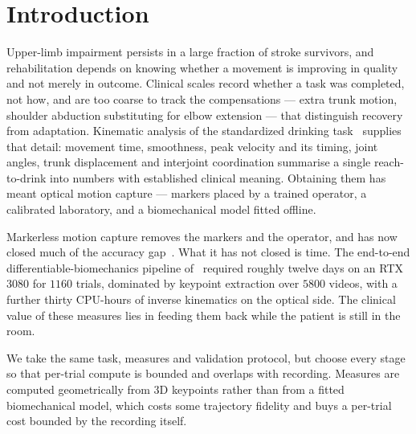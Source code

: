 \documentclass[conference]{IEEEtran}
\begin{document}
\section{Introduction}
\label{sec:intro}

Upper-limb impairment persists in a large fraction of stroke survivors, and
rehabilitation depends on knowing whether a movement is improving in quality and
not merely in outcome. Clinical scales record whether a task was completed, not
how, and are too coarse to track the compensations --- extra trunk motion,
shoulder abduction substituting for elbow extension --- that distinguish recovery
from adaptation. Kinematic analysis of the standardized drinking
task~\cite{murphy2011} supplies that detail: movement time, smoothness, peak
velocity and its timing, joint angles, trunk displacement and interjoint
coordination summarise a single reach-to-drink into numbers with established
clinical meaning. Obtaining them has meant optical motion capture --- markers
placed by a trained operator, a calibrated laboratory, and a biomechanical model
fitted offline.

Markerless motion capture removes the markers and the operator, and has now
closed much of the accuracy gap~\cite{unger2024}. What it has not closed is
time. The end-to-end differentiable-biomechanics pipeline
of~\cite{unger2024} required roughly twelve days on an RTX 3080 for $1160$
trials, dominated by keypoint extraction over $5800$ videos, with a further
thirty CPU-hours of inverse kinematics on the optical side. The clinical value
of these measures lies in feeding them back while the patient is still in the
room.

We take the same task, measures and validation protocol, but choose every stage
so that per-trial compute is bounded and overlaps with recording. Measures are
computed geometrically from 3D keypoints rather than from a fitted biomechanical
model, which costs some trajectory fidelity and buys a per-trial cost bounded by
the recording itself.
\end{document}
